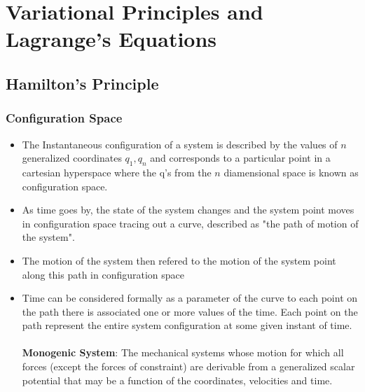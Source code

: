 \chapter{Variational Principles and Lagrange's Equations}
\section{Hamilton's Principle}
\subsection{Configuration Space}
\begin{itemize}
	\item The Instantaneous configuration of a system is described by the values of $n$ generalized coordinates $q_1,    q_n$ and corresponds to a particular point in a cartesian hyperspace where the q's from the $n$  diamensional space is known as configuration space.
	\item As time goes by, the state of the system changes and the system point moves in configuration space tracing out a curve, described as "the path of motion of the system".
	\item The motion of the system then refered to the motion of the system point along this path in configuration space
	\item Time can be considered formally as a parameter of the curve to each point on the path there is associated one or more values of the time. Each point on the path represent the entire system  configuration at some given instant of time.\\\\
	\textbf{Monogenic System}: The mechanical systems whose motion for which all forces  (except the forces of constraint) are derivable from a generalized scalar potential that may be a function of the coordinates, velocities and time.
\end{itemize}
